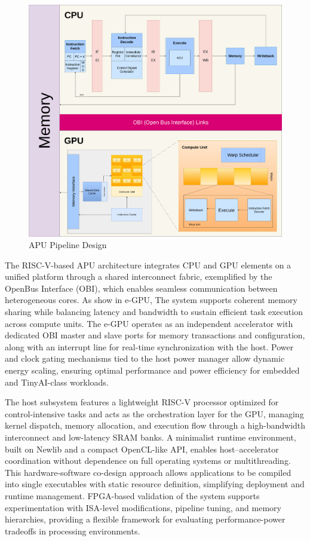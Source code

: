 \documentclass[a4paper,twoside]{article}
\begin{document}
\begin{figure}[h]
        \centering
        \includegraphics[width=1\textwidth]{../../pipeline_design.png}
        \caption{APU Pipeline Design}
        \label{fig.example}
\end{figure}

The RISC-V-based APU architecture integrates CPU and GPU elements on a unified platform through a shared interconnect fabric, exemplified by the OpenBus Interface (OBI), which enables seamless communication between heterogeneous cores. As show in e-GPU, The system supports coherent memory sharing while balancing latency and bandwidth to sustain efficient task execution across compute units. The e-GPU operates as an independent accelerator with dedicated OBI master and slave ports for memory transactions and configuration, along with an interrupt line for real-time synchronization with the host. Power and clock gating mechanisms tied to the host power manager allow dynamic energy scaling, ensuring optimal performance and power efficiency for embedded and TinyAI-class workloads.

The host subsystem features a lightweight RISC-V processor optimized for control-intensive tasks and acts as the orchestration layer for the GPU, managing kernel dispatch, memory allocation, and execution flow through a high-bandwidth interconnect and low-latency SRAM banks. A minimalist runtime environment, built on Newlib and a compact OpenCL-like API, enables host–accelerator coordination without dependence on full operating systems or multithreading. This hardware-software co-design approach allows applications to be compiled into single executables with static resource definition, simplifying deployment and runtime management. FPGA-based validation of the system supports experimentation with ISA-level modifications, pipeline tuning, and memory hierarchies, providing a flexible framework for evaluating performance-power tradeoffs in processing environments.
\end{document}
